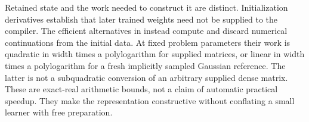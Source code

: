 \documentclass[11pt]{article}
\theoremstyle{definition}
\theoremstyle{remark}
\begin{document}
Retained state and the work needed to construct it are distinct.
Initialization derivatives establish that later trained weights need not
be supplied to the compiler. The efficient alternatives in
 instead compute and discard numerical
continuations from the initial data. At fixed problem parameters their
work is quadratic in width times a polylogarithm for supplied matrices,
or linear in width times a polylogarithm for a fresh implicitly sampled
Gaussian reference. The latter is not a subquadratic conversion of an
arbitrary supplied dense matrix. These are exact-real arithmetic bounds,
not a claim of automatic practical speedup. They make the representation
constructive without conflating a small learner with free preparation.




\appendix

\end{document}
